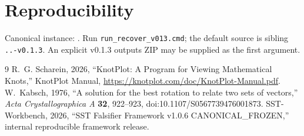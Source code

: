 \documentclass[11pt,a4paper]{article}
\newcommand{\code}[1]{\texttt{#1}}
\begin{document}
\section{Reproducibility}
Canonical instance: . Run \code{run\_recover\_v013.cmd}; the default source is sibling \code{..-v0.1.3}. An explicit v0.1.3 outputs ZIP may be supplied as the first argument.
\begin{thebibliography}{9}
 R.~G. Scharein, 2026, ``KnotPlot: A Program for Viewing Mathematical Knots,'' KnotPlot Manual, \url{https://knotplot.com/doc/KnotPlot-Manual.pdf}.
 W.~Kabsch, 1976, ``A solution for the best rotation to relate two sets of vectors,'' \emph{Acta Crystallographica A} \textbf{32}, 922--923, doi:10.1107/S0567739476001873.
 SST-Workbench, 2026, ``SST Falsifier Framework v1.0.6 CANONICAL\_FROZEN,'' internal reproducible framework release.
\end{thebibliography}
\end{document}
